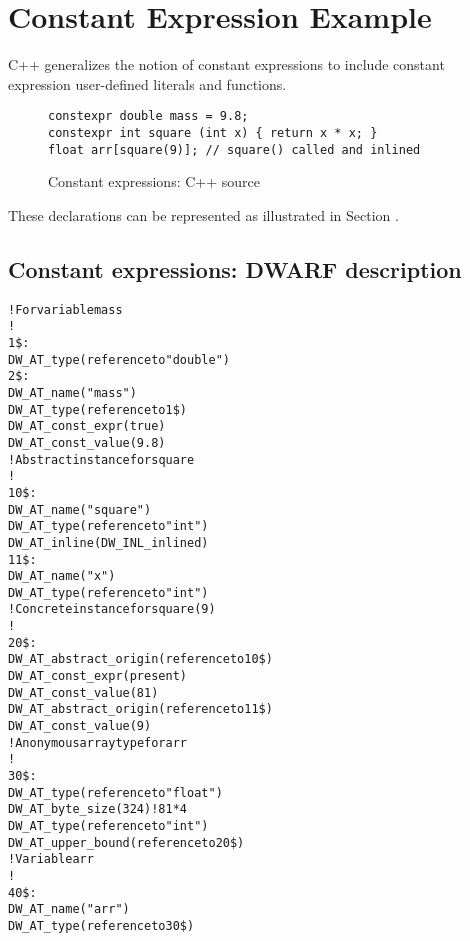 \section{Constant Expression Example}
\label{app:constantexpressionexample}
C++ generalizes the notion of constant expressions to include
constant expression user-defined literals and functions.

\begin{figure}[here]
\begin{lstlisting}
constexpr double mass = 9.8;
constexpr int square (int x) { return x * x; }
float arr[square(9)]; // square() called and inlined
\end{lstlisting}
\caption{Constant expressions: C++ source} \label{fig:constantexpressionscsource}
\end{figure}

These declarations can be represented as illustrated in 
Section .

\subsection{Constant expressions: DWARF description}
\label{app:constantexpressionsdwarfdescription}
\begin{alltt}

      ! For variable mass
      !
1\$:  
        DW\-\_AT\-\_type(reference to "double")
2\$:  
        DW\-\_AT\-\_name("mass")
        DW\-\_AT\-\_type(reference to 1\$)
        DW\-\_AT\-\_const\-\_expr(true)
        DW\-\_AT\-\_const\-\_value(9.8)
      ! Abstract instance for square
      !
10\$: 
        DW\-\_AT\-\_name("square")
        DW\-\_AT\-\_type(reference to "int")
        DW\-\_AT\-\_inline(DW\-\_INL\-\_inlined)
11\$:   
            DW\-\_AT\-\_name("x")
            DW\-\_AT\-\_type(reference to "int")
      ! Concrete instance for square(9)
      !
20\$: 
        DW\-\_AT\-\_abstract\-\_origin(reference to 10\$)
        DW\-\_AT\-\_const\-\_expr(present)
        DW\-\_AT\-\_const\-\_value(81)
            DW\-\_AT\-\_abstract\-\_origin(reference to 11\$)
            DW\-\_AT\-\_const\-\_value(9)
      ! Anonymous array type for arr
      !
30\$: 
        DW\-\_AT\-\_type(reference to "float")
        DW\-\_AT\-\_byte\-\_size(324) ! 81*4
            DW\-\_AT\-\_type(reference to "int")
            DW\-\_AT\-\_upper\-\_bound(reference to 20\$)
      ! Variable arr
      !
40\$: 
        DW\-\_AT\-\_name("arr")
        DW\-\_AT\-\_type(reference to 30\$)
\end{alltt}


